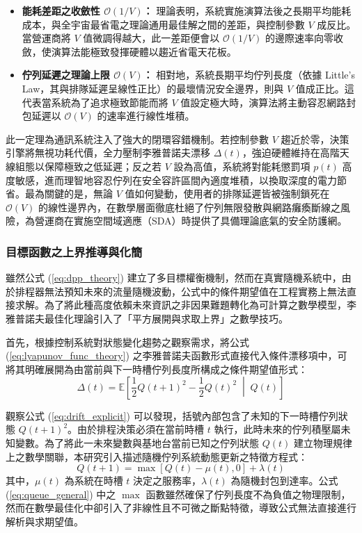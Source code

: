 \begin{itemize}
    \item \textbf{能耗差距之收斂性 $\mathcal{O}(1/V)$：} 理論表明，系統實施演算法後之長期平均能耗成本，與全宇宙最省電之理論通用最佳解之間的差距，與控制參數 $V$ 成反比。當營運商將 $V$ 值微調得越大，此一差距便會以 $\mathcal{O}(1/V)$ 的邊際速率向零收斂，使演算法能極致發揮硬體以趨近省電天花板。
    \item \textbf{佇列延遲之理論上限 $\mathcal{O}(V)$：} 相對地，系統長期平均佇列長度（依據 Little's Law，其與排隊延遲呈線性正比）的最壞情況安全邊界，則與 $V$ 值成正比。這代表當系統為了追求極致節能而將 $V$ 值設定極大時，演算法將主動容忍網路封包延遲以 $\mathcal{O}(V)$ 的速率進行線性堆積。
\end{itemize}

此一定理為通訊系統注入了強大的閉環容錯機制。若控制參數 $V$ 趨近於零，決策引擎將無視功耗代價，全力壓制李雅普諾夫漂移 $\Delta(t)$，強迫硬體維持在高階天線組態以保障極致之低延遲；反之若 $V$ 設為高值，系統將對能耗懲罰項 $p(t)$ 高度敏感，進而理智地容忍佇列在安全容許區間內適度堆積，以換取深度的電力節省。最為關鍵的是，無論 $V$ 值如何變動，使用者的排隊延遲皆被強制鎖死在 $\mathcal{O}(V)$ 的線性邊界內，在數學層面徹底杜絕了佇列無限發散與網路癱瘓斷線之風險，為營運商在實施空間域適應（SDA）時提供了具備理論底氣的安全防護網。
\subsubsection{目標函數之上界推導與化簡}
雖然公式 (\ref{eq:dpp_theory}) 建立了多目標權衡機制，然而在真實隨機系統中，由於排程器無法預知未來的流量隨機波動，公式中的條件期望值在工程實務上無法直接求解。為了將此種高度依賴未來資訊之非因果難題轉化為可計算之數學模型，李雅普諾夫最佳化理論引入了「平方展開與求取上界」之數學技巧。

首先，根據控制系統對狀態變化趨勢之觀察需求，將公式 (\ref{eq:lyapunov_func_theory}) 之李雅普諾夫函數形式直接代入條件漂移項中，可將其明確展開為由當前與下一時槽佇列長度所構成之條件期望值形式：
\begin{equation}
    \Delta(t) = \mathbb{E}\left[ \frac{1}{2} Q(t+1)^2 - \frac{1}{2} Q(t)^2 \;\middle|\; Q(t) \right]
    \label{eq:drift_explicit}
\end{equation}

觀察公式 (\ref{eq:drift_explicit}) 可以發現，括號內部包含了未知的下一時槽佇列狀態 $Q(t+1)^2$。由於排程決策必須在當前時槽 $t$ 執行，此時未來的佇列積壓屬未知變數。為了將此一未來變數與基地台當前已知之佇列狀態 $Q(t)$ 建立物理規律上之數學關聯，本研究引入描述隨機佇列系統動態更新之特徵方程式：
\begin{equation}
    Q(t+1) = \max[Q(t) - \mu(t), 0] + \lambda(t)
    \label{eq:queue_general}
\end{equation}
其中，$\mu(t)$ 為系統在時槽 $t$ 決定之服務率，$\lambda(t)$ 為隨機封包到達率。公式 (\ref{eq:queue_general}) 中之 $\max$ 函數雖然確保了佇列長度不為負值之物理限制，然而在數學最佳化中卻引入了非線性且不可微之斷點特徵，導致公式無法直接進行解析與求期望值。

